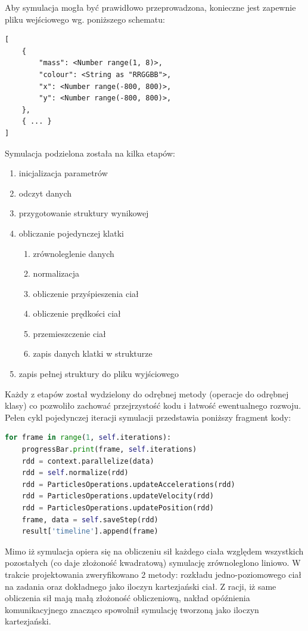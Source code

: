 \documentclass[a4paper,onecolumn,oneside,12pt]{memoir}
\begin{document}
{Aby symulacja mogła być prawidłowo przeprowadzona, konieczne jest zapewnie pliku wejściowego
wg. poniższego schematu:

\begin{lstlisting}[caption=Plik wejściowy symulacji]
[
    {
        "mass": <Number range(1, 8)>,
        "colour": <String as "RRGGBB">,
        "x": <Number range(-800, 800)>,
        "y": <Number range(-800, 800)>,
    },
    { ... }
]
\end{lstlisting}

Symulacja podzielona została na kilka etapów:
\begin{enumerate}
\item inicjalizacja parametrów
\item odczyt danych
\item przygotowanie struktury wynikowej
\item obliczanie pojedynczej klatki
	\begin{enumerate}
	\item zrównoleglenie danych
	\item normalizacja
	\item obliczenie przyśpieszenia ciał
	\item obliczenie prędkości ciał
	\item przemieszczenie ciał
	\item zapis danych klatki w strukturze
	\end{enumerate}
\item zapis pełnej struktury do pliku wyjściowego
\end{enumerate}

Każdy z etapów został wydzielony do odrębnej metody (operacje do odrębnej klasy) co
pozwoliło zachować przejrzystość kodu i łatwość ewentualnego rozwoju. Pełen cykl
pojedynczej iteracji symulacji przedstawia poniższy fragment kody:
\pagebreak
\begin{lstlisting}[language=Python, caption=Plik wejściowy symulacji]
for frame in range(1, self.iterations):
	progressBar.print(frame, self.iterations)
	rdd = context.parallelize(data)
	rdd = self.normalize(rdd)
	rdd = ParticlesOperations.updateAccelerations(rdd)
	rdd = ParticlesOperations.updateVelocity(rdd)
	rdd = ParticlesOperations.updatePosition(rdd)
	frame, data = self.saveStep(rdd)
	result['timeline'].append(frame)
\end{lstlisting}

Mimo iż symulacja opiera się na obliczeniu sił każdego ciała względem wszystkich pozostałych
(co daje złożoność kwadratową) symulację zrównoleglono liniowo. W trakcie projektowania
zweryfikowano 2 metody: rozkładu jedno-poziomowego ciał na zadania oraz dokładnego jako
iloczyn kartezjański ciał. Z racji, iż same obliczenia sił mają małą złożoność obliczeniową,
nakład opóźnienia komunikacyjnego znacząco spowolnił symulację tworzoną jako iloczyn kartezjański.

}
\end{document}
